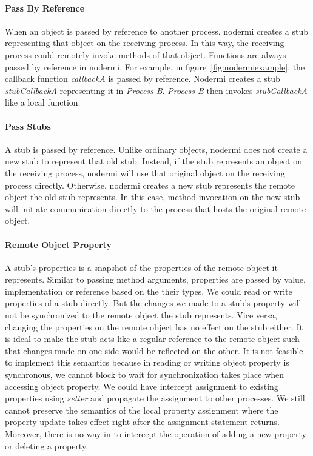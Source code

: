 \paragraph{Pass By Reference}
When an object is passed by reference to another process,
nodermi creates a stub representing that object on the receiving process.
In this way, 
the receiving process could remotely invoke methods of that object.
Functions are always passed by reference in nodermi.
For example, in figure~\ref{fig:nodermiexample}, the callback function 
\emph{callbackA} is passed by reference. Nodermi creates
a stub \emph{stubCallbackA} representing it in \emph{Process B}.
\emph{Process B} then invokes \emph{stubCallbackA} like a local function.

\paragraph{Pass Stubs}
A stub is passed by reference. Unlike ordinary objects,
nodermi does not create a new stub to represent that old
stub.
Instead, if the stub represents an object on the receiving 
process, nodermi will use that original object on the receiving 
process directly.
Otherwise, nodermi creates a new stub represents
the remote object the old stub represents.
In this case, method invocation on the new stub will
initiate communication directly to the process that 
hosts the original remote object.



\paragraph{Remote Object Property}
A stub's properties is a snapshot of the properties
of the remote object it represents.
Similar to passing method arguments,
properties are passed by value, implementation or reference
based on the their types.
We could read or write properties of a stub directly.
But the changes we made to a stub's property 
will not be synchronized to the remote object the stub represents.
Vice versa,
changing the properties on the remote object has no effect
on the stub either.
It is ideal to make the stub acts like a regular reference
to the remote object such that
changes made on one side would be reflected on the other.
It is not feasible to implement this semantics because
in \js{} reading or writing object property is synchronous,
we cannot block to wait for synchronization takes place
 when accessing object property.
We could have intercept assignment to existing properties using
\emph{setter} and propagate the assignment to other processes.
We still cannot preserve the semantics of the local property assignment
where the property update takes effect right after the assignment statement returns. 
Moreover, there is no way in \js{} to intercept the operation of 
adding a new property or deleting a property.



